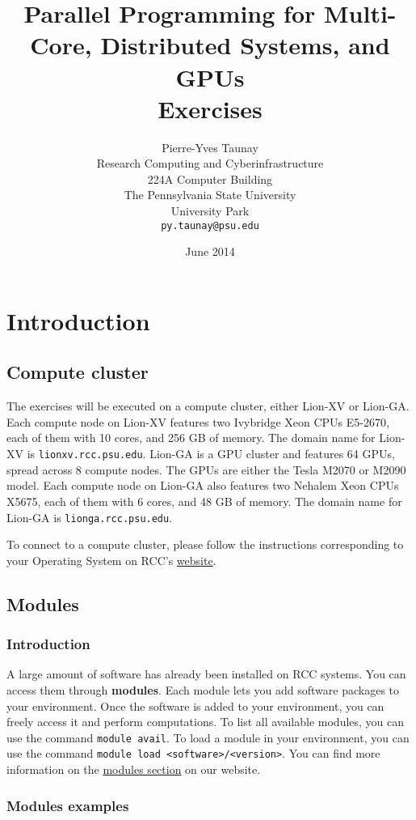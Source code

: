 \documentclass[letterpaper,10pt]{article}
\title{Parallel Programming for Multi-Core, Distributed Systems, and GPUs \\ Exercises}
\author{Pierre-Yves Taunay\\
	  Research Computing and Cyberinfrastructure\\
	    224A Computer Building\\
	    The Pennsylvania State University\\
	    University Park\\
	    \texttt{py.taunay@psu.edu}}
\date{June 2014}
\begin{document}
\maketitle

\newpage
\section{Introduction}
\subsection{Compute cluster}
The exercises will be executed on a compute cluster, either Lion-XV or Lion-GA. Each compute node on Lion-XV features two Ivybridge Xeon CPUs E5-2670, each of them with 10 cores, and 256 GB of memory. The domain name for Lion-XV is 
\texttt{lionxv.rcc.psu.edu}. Lion-GA is a GPU cluster and features 64 GPUs, spread across 8 compute nodes. The GPUs are either the Tesla M2070 or M2090 model. Each compute node on Lion-GA also features two Nehalem Xeon CPUs X5675, each of them with 6 cores, and 48 GB of memory. The domain
name for Lion-GA is \texttt{lionga.rcc.psu.edu}. 

To connect to a compute cluster, please follow the instructions corresponding to your Operating System on RCC's \href{{http://rcc.its.psu.edu/user_guides/remote_connectivity/}}{website}.

\subsection{Modules}
\subsubsection{Introduction}
A large amount of software has already been installed on RCC systems. You can access them through \textbf{modules}. Each module lets you add software packages to your environment. Once the software is added to your environment, you can
freely access it and perform computations. To list all available modules, you can use the command \texttt{module avail}. To load a module in your environment, you can use the command \texttt{module load <software>/<version>}. You
can find more information on the \href{http://rcc.its.psu.edu/user_guides/system_utilities/modules/}{modules section} on our website. 

\subsubsection{Modules examples}
\end{document}
